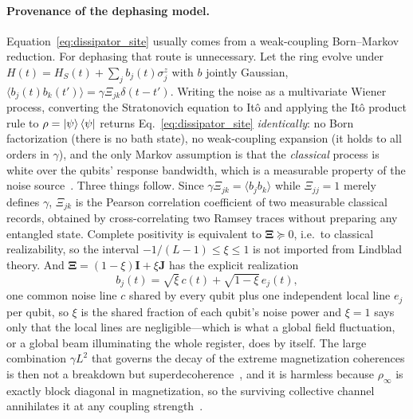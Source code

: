 \documentclass[aps,prl,reprint,amsmath,amssymb,floatfix]{revtex4-2}
\begin{document}
\paragraph*{Provenance of the dephasing model.}
Equation~\eqref{eq:dissipator_site} usually comes from a weak-coupling Born--Markov reduction. For dephasing that route is unnecessary. Let the ring
evolve under $H(t)=H_S(t)+\sum_jb_j(t)\sigma^z_j$ with $b$ jointly Gaussian,
$\langle b_j(t)b_k(t')\rangle=\gamma\Xi_{jk}\delta(t-t')$. Writing the noise as
a multivariate Wiener process, converting the Stratonovich equation to It\^o
and applying the It\^o product rule to $\rho=\ket{\psi}\bra{\psi}$ returns
Eq.~\eqref{eq:dissipator_site} \emph{identically}: no Born factorization (there
is no bath state), no weak-coupling expansion (it holds to all orders in
$\gamma$), and the only Markov assumption is that the \emph{classical} process
is white over the qubits' response bandwidth, which is a measurable property of
the noise source~\cite{SM}. Three things follow. Since
$\gamma\Xi_{jk}=\langle b_jb_k\rangle$ while $\Xi_{jj}=1$ merely defines
$\gamma$, $\Xi_{jk}$ is the Pearson correlation coefficient of two measurable
classical records, obtained by cross-correlating two Ramsey traces without
preparing any entangled state. Complete positivity is equivalent to
$\bm\Xi\succeq0$, i.e.\ to classical realizability, so the interval
$-1/(L-1)\le\xi\le1$ is not imported from Lindblad theory. And
$\bm\Xi=(1-\xi)\mathbf I+\xi\mathbf J$ has the explicit realization
\begin{equation}
\label{eq:onenoiseline}
b_j(t)=\sqrt{\xi}\,c(t)+\sqrt{1-\xi}\,e_j(t),
\end{equation}
one common noise line $c$ shared by every qubit plus one independent local line
$e_j$ per qubit, so $\xi$ is the shared fraction of each qubit's noise power
and $\xi=1$ says only that the local lines are negligible---which is what a
global field fluctuation, or a global beam illuminating the whole register,
does by itself. The large combination $\gamma L^2$ that governs the decay of
the extreme magnetization coherences is then not a breakdown but
superdecoherence~\cite{PalmaSuominenEkert1996,Monz2011}, and it is harmless
because $\rho_\infty$ is exactly block diagonal in magnetization, so the
surviving collective channel annihilates it at any coupling
strength~\cite{SM}.
\end{document}
